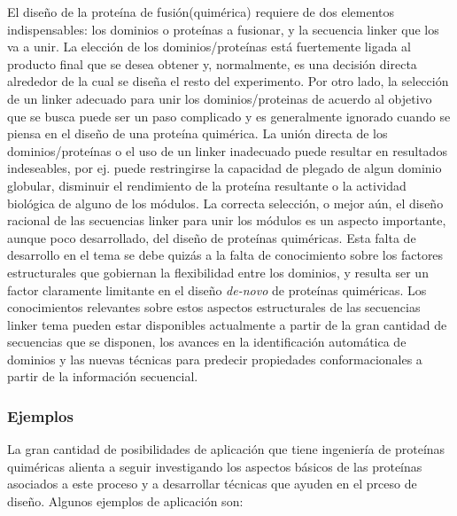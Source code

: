 El diseño de la proteína de fusión(quimérica) requiere de dos elementos indispensables:
los dominios o proteínas a fusionar, y la secuencia linker que los va a unir.
La elección de los dominios/proteínas está fuertemente ligada al producto final que se desea obtener y, normalmente, es una decisión directa alrededor de la cual se diseña el resto del experimento.
Por otro lado, la selección de un linker adecuado para unir los dominios/proteinas de acuerdo al objetivo que se busca puede ser un paso complicado y es generalmente ignorado cuando se piensa en el diseño de una proteína quimérica.
La unión directa de los dominios/proteínas o el uso de un linker inadecuado puede resultar en resultados indeseables, por ej. puede restringirse la capacidad de plegado de algun dominio globular, 
disminuir el rendimiento de la proteína resultante o la actividad biológica de alguno de los módulos.
La correcta selección, o mejor aún, el diseño racional de las secuencias linker para unir los módulos es un aspecto importante, aunque poco desarrollado, del diseño de proteínas quiméricas. 
Esta falta de desarrollo en el tema se debe quizás a la falta de conocimiento sobre los factores estructurales que gobiernan la flexibilidad entre los dominios, y resulta ser un factor claramente 
limitante en el diseño \textit{de-novo} de proteínas quiméricas. 
Los conocimientos relevantes sobre estos aspectos estructurales de las secuencias linker tema pueden estar disponibles actualmente a partir de la gran cantidad de secuencias que se disponen, los avances en 
la identificación automática de dominios y las nuevas técnicas para predecir propiedades conformacionales a partir de la información secuencial.



\subsubsection{Ejemplos}


%



La gran cantidad de posibilidades de aplicación que tiene ingeniería de proteínas quiméricas alienta a seguir investigando 
los aspectos básicos de las proteínas asociados a este proceso y a desarrollar técnicas que ayuden en el prceso de diseño.
Algunos ejemplos de aplicación son: 

